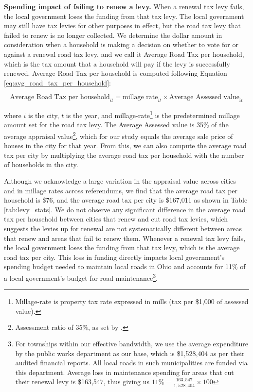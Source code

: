 {\bf Spending impact of failing to renew a levy.} When a renewal tax levy fails, the local government loses the funding from that tax levy. The local government may still have tax levies for other purposes in effect, but the road tax levy that failed to renew is no longer collected. We determine the dollar amount in consideration when a household is making a decision on whether to vote for or against a renewal road tax levy, and we call it Average Road Tax per household, which is the tax amount that a household will pay if the levy is successfully renewed. Average Road Tax per household is computed following Equation \ref{eq:avg_road_tax_per_household}:

\begin{equation}
\text{Average Road Tax per household}_{it} = \text{millage rate}_{it} \times \text{Average Assessed value}_{it}
\label{eq:avg_road_tax_per_household}
\end{equation}

\noindent where $i$ is the city, $t$ is the year, and millage-rate\footnote{Millage-rate is property tax rate expressed in mills (tax per \$1,000 of assessed value).} is the predetermined millage amount set for the road tax levy. The Average Assessed value is 35\% of the average appraisal value\footnote{Assessment ratio of 35\%, as set by \cite{OhioRealPropertyTax}.}, which for our study equals the average sale price of houses in the city for that year. From this, we can also compute the average road tax per city by multiplying the average road tax per household with the number of households in the city.

Although we acknowledge a large variation in the appraisal value across cities and in millage rates across referendums, we find that the average road tax per household is \$76, and the average road tax per city is \$167,011 as shown in Table \ref{tab:levy_stats}. We do not observe any significant difference in the average road tax per household between cities that renew and cut road tax levies, which suggests the levies up for renewal are not systematically different between areas that renew and areas that fail to renew them. Whenever a renewal tax levy fails, the local government loses the funding from that tax levy, which is the average road tax per city. This loss in funding directly impacts local government's spending budget needed to maintain local roads in Ohio and accounts for 11\% of a local government's budget for road maintenance\footnote{For townships within our effective bandwidth, we use the average expenditure by the public works department as our base, which is \$1,528,404 as per their audited financial reports. All local roads in such municipalities are funded via this department. Average loss in maintenance spending for areas that cut their renewal levy is \$163,547, thus giving us $11\% = \frac{163,547}{1,528,404} \times 100$ }.

